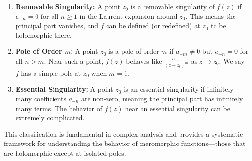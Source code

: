\begin{enumerate}
    \item \textbf{Removable Singularity:} A point $z_0$ is a removable singularity of $f(z)$ if $a_{-n} = 0$ for all $n \geq 1$ in the Laurent expansion around $z_0$. This means the principal part vanishes, and $f$ can be defined (or redefined) at $z_0$ to be holomorphic there.
    
    \item \textbf{Pole of Order $m$:} A point $z_0$ is a pole of order $m$ if $a_{-m} \neq 0$ but $a_{-n} = 0$ for all $n > m$. Near such a point, $f(z)$ behaves like $\frac{a_{-m}}{(z - z_0)^m}$ as $z \to z_0$. We say $f$ has a simple pole at $z_0$ when $m = 1$.
    
    \item \textbf{Essential Singularity:} A point $z_0$ is an essential singularity if infinitely many coefficients $a_{-n}$ are non-zero, meaning the principal part has infinitely many terms. The behavior of $f(z)$ near an essential singularity can be extremely complicated.
\end{enumerate}

\noindent This classification is fundamental in complex analysis and provides a systematic framework for understanding the behavior of meromorphic functions—those that are holomorphic except at isolated poles.


